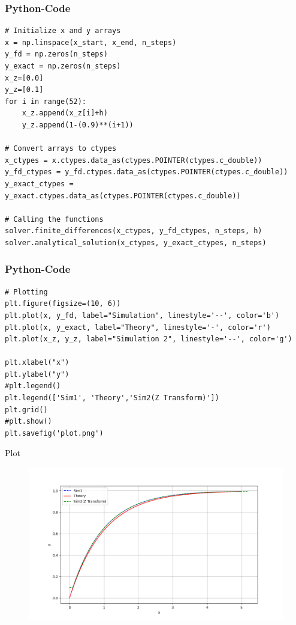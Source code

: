 \documentclass{beamer}
\begin{document}
\begin{frame}[fragile]
  \frametitle{Python-Code}

\begin{verbatim}
# Initialize x and y arrays
x = np.linspace(x_start, x_end, n_steps)
y_fd = np.zeros(n_steps)
y_exact = np.zeros(n_steps)
x_z=[0.0]
y_z=[0.1]
for i in range(52):
    x_z.append(x_z[i]+h)
    y_z.append(1-(0.9)**(i+1))

# Convert arrays to ctypes
x_ctypes = x.ctypes.data_as(ctypes.POINTER(ctypes.c_double))
y_fd_ctypes = y_fd.ctypes.data_as(ctypes.POINTER(ctypes.c_double))
y_exact_ctypes = y_exact.ctypes.data_as(ctypes.POINTER(ctypes.c_double))

# Calling the functions 
solver.finite_differences(x_ctypes, y_fd_ctypes, n_steps, h)
solver.analytical_solution(x_ctypes, y_exact_ctypes, n_steps)
\end{verbatim}
\end{frame}
\begin{frame}[fragile]
  \frametitle{Python-Code}
  

\begin{verbatim}
# Plotting
plt.figure(figsize=(10, 6))
plt.plot(x, y_fd, label="Simulation", linestyle='--', color='b')
plt.plot(x, y_exact, label="Theory", linestyle='-', color='r')
plt.plot(x_z, y_z, label="Simulation 2", linestyle='--', color='g')

plt.xlabel("x")
plt.ylabel("y")
#plt.legend()
plt.legend(['Sim1', 'Theory','Sim2(Z Transform)'])
plt.grid()
#plt.show()
plt.savefig('plot.png')
\end{verbatim}
\end{frame}
\begin{frame}{Plot}
    \begin{figure}[h!]
    \centering
    \includegraphics[width=0.7\columnwidth]{figs/Q1.png}
    \label{stemplot}
\end{figure}
\end{frame}
\end{document}
